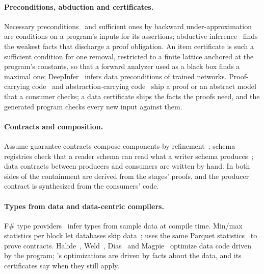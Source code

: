\paragraph{Preconditions, abduction and certificates.} Necessary preconditions~\cite{cousot2013} and
sufficient ones by backward under-approximation~\cite{mine2014} are conditions on a program's inputs
for its assertions; abductive inference~\cite{dillig2012} finds the weakest facts that discharge a
proof obligation. An item certificate is such a sufficient condition for one removal, restricted to a
finite lattice anchored at the program's constants, so that a forward analyzer used as a black box
finds a maximal one; DeepInfer~\cite{ahmed2024} infers data preconditions of trained networks.
Proof-carrying code~\cite{necula1997} and abstraction-carrying code~\cite{albert2004} ship a proof or
an abstract model that a consumer checks; a data certificate ships the facts the proofs need, and the
generated program checks every new input against them.

\paragraph{Contracts and composition.} Assume-guarantee contracts compose components by
refinement~\cite{benveniste2018}; schema registries check that a reader schema can read what a writer
schema produces~\cite{avro}; data contracts between producers and consumers are written by hand. In
\PL both sides of the containment are derived from the stages' proofs, and the producer contract is
synthesized from the consumers' code.

\paragraph{Types from data and data-centric compilers.} F\# type providers~\cite{petricek2016} infer
types from sample data at compile time. Min/max statistics per block let databases skip
data~\cite{moerkotte1998}; \PL uses the same Parquet statistics~\cite{parquet} to prove contracts.
Halide~\cite{ragan2013}, Weld~\cite{palkar2017}, Dias~\cite{baziotis2024} and
Magpie~\cite{jindal2021} optimize data code driven by the program; \PL's optimizations are driven by
facts about the data, and its certificates say when they still apply.
